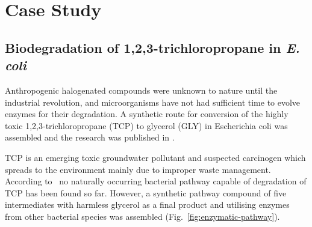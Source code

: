 \documentclass{llncs}
\newcommand{\sas}[1][]{\widetilde{\mathcal{A}}_{#1}}
\begin{document}
%



\section{Case Study}


\subsection{Biodegradation of 1,2,3-trichloropropane in \emph{E. coli}}

Anthropogenic halogenated compounds were unknown to nature until the industrial revolution, and microorganisms have not had sufficient time to evolve enzymes for their degradation. A synthetic route for conversion of the highly toxic  1,2,3-trichloropropane (TCP) to glycerol (GLY) in Escherichia coli was assembled and the research was published  in \cite{kurumbang2013computer}. 

TCP is an emerging toxic groundwater pollutant and suspected carcinogen which spreads to the environment mainly due to improper waste management. According to~\cite{kurumbang2013computer} no naturally occurring bacterial pathway capable of degradation of TCP has been found so far. However,  a synthetic pathway compound of five intermediates with harmless glycerol as a final product and utilising enzymes from other bacterial species was assembled (Fig.~\ref{fig:enzymatic-pathway}). 
\end{document}
